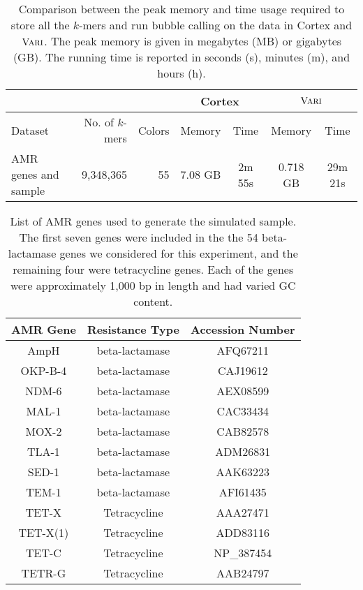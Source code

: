 \documentclass{article}
\def\ours{\mbox{\rm {\sc Vari}}}
\begin{document}
\begin{table*}%
  \small
  \centering
  \begin{tabular}{| l | r | r | c | c | c |c |}
   	\hline
	\multicolumn{1}{|l}{}
   	& \multicolumn{1}{r}{}	
	& \multicolumn{1}{r}{} 
	& \multicolumn{2}{c|}{{\sc Cortex}} 
	& \multicolumn{2}{|c|}{$\ours$}  \\
	\hline
	 Dataset & No. of $k$-mers & Colors & Memory & Time & Memory & Time \\
	\hline
	AMR genes and sample  					& 9,348,365 		& 55 	& 7.08 GB 	& 2m 55s	& 0.718 GB 	& 29m 21s \\
	\hline
	\end{tabular}
  \caption{Comparison between the peak memory and time usage required to store all the $k$-mers and run bubble calling on the data in {\sc Cortex} and $\ours$.
    The peak memory is given in megabytes (MB) or gigabytes (GB). The running time is reported in seconds (s), minutes (m), and hours (h).}
 \label{tbl-cosmo}
\end{table*}

\begin{table}[h!]
  \small
  \centering
  \begin{tabular}{c|c|c}
		{\bf AMR Gene}&{\bf Resistance Type}&{\bf Accession Number} 	 \\
	\hline
	\hline
	AmpH & beta-lactamase & AFQ67211 \\
	OKP-B-4 & beta-lactamase & CAJ19612 \\
	NDM-6 & beta-lactamase  & AEX08599 \\
	MAL-1 & beta-lactamase & CAC33434  \\
	MOX-2 & beta-lactamase  & CAB82578  \\
	TLA-1 & beta-lactamase & ADM26831   \\
	SED-1 & beta-lactamase  & AAK63223   \\
	TEM-1& beta-lactamase  & AFI61435   \\
	TET-X & Tetracycline & AAA27471   \\
	TET-X(1) & Tetracycline  & ADD83116 \\
	TET-C & Tetracycline  & NP\_387454  \\
	TETR-G & Tetracycline & AAB24797 \\
 	\end{tabular}
      \caption{List of AMR genes used to generate the simulated sample. The first seven genes were included in the the 54 beta-lactamase genes we considered for this experiment, and the remaining four were tetracycline genes. Each of the genes were approximately 1,000 bp in length and had varied GC content.}
 \label{tbl-amr}
\end{table}
\end{document}
